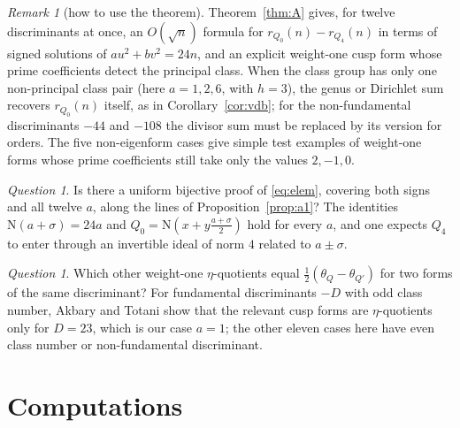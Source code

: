 \documentclass[11pt]{amsart}
\theoremstyle{definition}
\theoremstyle{remark}
\newtheorem{remark}[lemma]{Remark}
\newtheorem{question}[lemma]{Question}
\begin{document}
\begin{remark}[how to use the theorem]
Theorem~\ref{thm:A} gives, for twelve discriminants at once, an $O(\sqrt n)$ formula for $r_{Q_0}(n)-r_{Q_4}(n)$ in terms of signed solutions of $au^2+bv^2=24n$, and an explicit weight-one cusp form whose prime coefficients detect the principal class. When the class group has only one non-principal class pair (here $a=1,2,6$, with $h=3$), the genus or Dirichlet sum recovers $r_{Q_0}(n)$ itself, as in Corollary~\ref{cor:vdb}; for the non-fundamental discriminants $-44$ and $-108$ the divisor sum must be replaced by its version for orders. The five non-eigenform cases give simple test examples of weight-one forms whose prime coefficients still take only the values $2,-1,0$.
\end{remark}

\begin{question}
Is there a uniform bijective proof of \eqref{eq:elem}, covering both signs and all twelve $a$, along the lines of Proposition~\ref{prop:a1}? The identities $\mathrm N(a+\sigma)=24a$ and $Q_0=\mathrm N(x+y\frac{a+\sigma}2)$ hold for every $a$, and one expects $Q_4$ to enter through an invertible ideal of norm $4$ related to $a\pm\sigma$.
\end{question}

\begin{question}
Which other weight-one $\eta$-quotients equal $\frac12(\theta_{Q}-\theta_{Q'})$ for two forms of the same discriminant? For fundamental discriminants $-D$ with odd class number, Akbary and Totani \cite{AT} show that the relevant cusp forms are $\eta$-quotients only for $D=23$, which is our case $a=1$; the other eleven cases here have even class number or non-fundamental discriminant.
\end{question}

\section{Computations}\label{sec:comp}
\end{document}
